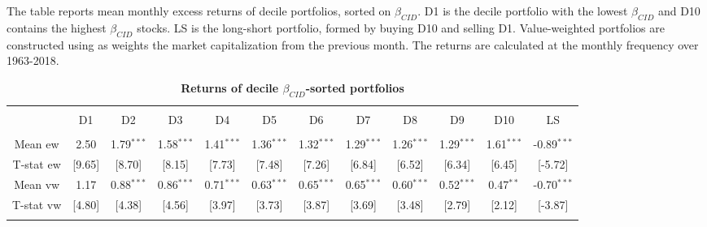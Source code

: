 \documentclass[12pt]{article}
\begin{document}
\begin{table}[!htbp] \centering 
  \caption{\textbf{Returns of decile $\beta_{CID}$-sorted portfolios}} 
  \label{} 
  \begin{flushleft}
    {\medskip\small
 The table reports mean monthly excess returns of decile portfolios, sorted on $\beta_{CID}$. D1 is the decile portfolio with the lowest $\beta_{CID}$ and D10 contains the highest $\beta_{CID}$ stocks. LS is the long-short portfolio, formed by buying D10 and selling D1. Value-weighted portfolios are constructed using as weights the market capitalization from the previous month. The returns are calculated at the monthly frequency over 1963-2018.}
    \medskip
    \end{flushleft}
\begin{tabular}{@{\extracolsep{-5pt}} cccccccccccc} 
\\[-1.8ex]\hline 
\hline \\[-1.8ex] 
 & D1 & D2 & D3 & D4 & D5 & D6 & D7 & D8 & D9 & D10 & LS \\ 
\hline \\[-1.8ex] 
Mean ew & 2.50 & 1.79$^{***}$ & 1.58$^{***}$ & 1.41$^{***}$ & 1.36$^{***}$ & 1.32$^{***}$ & 1.29$^{***}$ & 1.26$^{***}$ & 1.29$^{***}$ & 1.61$^{***}$ & -0.89$^{***}$ \\ 
T-stat ew & [9.65] & [8.70] & [8.15] & [7.73] & [7.48] & [7.26] & [6.84] & [6.52] & [6.34] & [6.45] & [-5.72] \\ 
Mean vw & 1.17 & 0.88$^{***}$ & 0.86$^{***}$ & 0.71$^{***}$ & 0.63$^{***}$ & 0.65$^{***}$ & 0.65$^{***}$ & 0.60$^{***}$ & 0.52$^{***}$ & 0.47$^{**}$ & -0.70$^{***}$ \\ 
T-stat vw & [4.80] & [4.38] & [4.56] & [3.97] & [3.73] & [3.87] & [3.69] & [3.48] & [2.79] & [2.12] & [-3.87] \\ 
\hline \\[-1.8ex] 
\end{tabular} 
\end{table}
\end{document}
